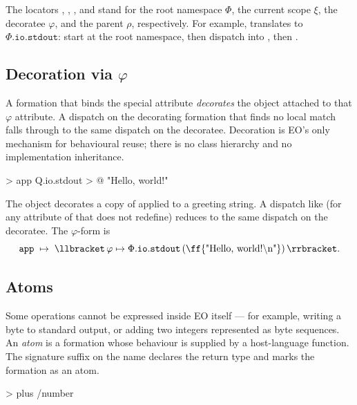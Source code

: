 The locators , \ff{\$}, , and \ff{\textasciicircum} stand for
  the root namespace \(\Phi\), the current scope \(\xi\), the decoratee
  \(\varphi\), and the parent \(\rho\), respectively.
For example,  translates to \(\Phi.\mathtt{io}.\mathtt{stdout}\):
  start at the root namespace, then dispatch into , then .

\subsection{Decoration via \texorpdfstring{\(\varphi\)}{phi}}\label{sec:over:decoration}

A formation that binds the special attribute  \emph{decorates} the
  object attached to that \(\varphi\) attribute.
A dispatch on the decorating formation that finds no local match falls
  through to the same dispatch on the decoratee.
Decoration is EO's only mechanism for behavioural reuse;
  there is no class hierarchy and no implementation inheritance.

\begin{ffcode}
[] > app
  Q.io.stdout > @
    "Hello, world!\n"
\end{ffcode}

The object  decorates a copy of  applied to a
  greeting string.
A dispatch like  (for any attribute of  that
   does not redefine) reduces to the same dispatch on the
  decoratee.
The \(\varphi\)-form is
\begin{equation*}
  \mathtt{app}\;\mapsto\;
    \llbracket\,
      \varphi \mapsto \Phi.\mathtt{io}.\mathtt{stdout}\,(\text{\ff{"Hello, world!\textbackslash n"}})
    \,\rrbracket.
\end{equation*}

\subsection{Atoms}\label{sec:over:atom}

Some operations cannot be expressed inside EO itself --- for example,
  writing a byte to standard output, or adding two integers represented as
  byte sequences.
An \emph{atom} is a formation whose behaviour is supplied by a
  host-language function.
The signature suffix  on the name declares the return type and
  marks the formation as an atom.

\begin{ffcode}
[x] > plus /number
\end{ffcode}

